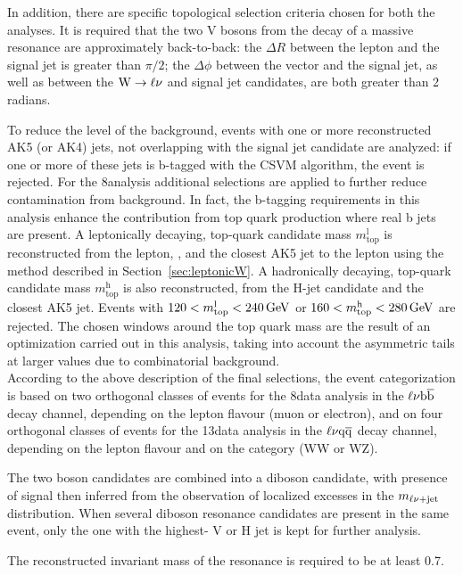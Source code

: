 In addition, there are specific topological selection criteria chosen for both the analyses. 
It is required that the two V bosons from the decay of a massive resonance are approximately back-to-back:
the $\Delta R$ between the lepton and the signal jet is greater than $\pi/2$; the $\Delta\phi$ between the vector \ptvecmiss and the signal jet,
as well as between the $\mathrm{W}\to\ell\nu$ and signal jet candidates, are both greater than 2 radians.

To reduce the level of the \ttbar background, events with one or more reconstructed AK5 (or AK4) jets, not overlapping with the signal jet candidate are analyzed:
if one or more of these jets is b-tagged with the CSVM algorithm, the event is rejected.
For the 8\TeV analysis additional selections are applied to further reduce contamination from \ttbar background.
In fact, the b-tagging requirements in this analysis enhance the contribution from top quark production where real b jets are present.
A leptonically decaying, top-quark candidate mass $m_\mathrm{top}^\mathrm{l}$ is reconstructed from the lepton, \ETmiss, and the closest AK5 jet to the lepton using the method described in Section~\ref{sec:leptonicW}.
A hadronically decaying, top-quark candidate mass $m_\mathrm{top}^\mathrm{h}$ is also reconstructed, from the H-jet candidate and the closest AK5 jet.
Events with $120 < m_\mathrm{top}^\mathrm{l} < 240\,\text{Ge\hspace{-.08em}V}$ or $160 < m_\mathrm{top}^\mathrm{h} < 280\,\text{Ge\hspace{-.08em}V}$ are rejected.
The chosen windows around the top quark mass are the result of an optimization carried out in this analysis, taking into account
the asymmetric tails at larger values due to combinatorial background.\\

According to the above description of the final selections, the event categorization is based on two orthogonal classes of events for the 8\TeV data analysis in the $\ell\nu{\mathrm{b}\overline{\mathrm{b}}}$ decay channel,
depending on the lepton flavour (muon or electron),
and on four orthogonal classes of events for the 13\TeV data analysis in the $\ell\nu\mathrm{q}\overline{\mathrm{q}}$ decay channel, depending on the lepton flavour and on the \mJ category (WW or WZ).

The two boson candidates are combined into a diboson candidate, with presence of signal then inferred from the observation of localized excesses in the $m_{\ell\nu+{\rm jet}}$ distribution.
When several diboson resonance candidates are present in the same event, only the one with the highest-\pt
V or H jet is kept for further analysis.

The reconstructed invariant mass of the resonance is required to be at least 0.7\TeV.\\ 

